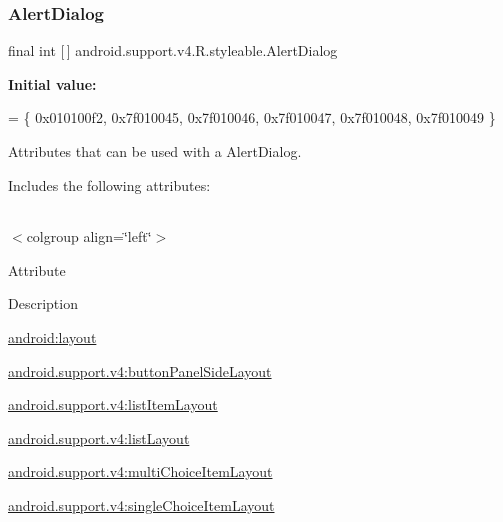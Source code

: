 \subsubsection{\texorpdfstring{Alert\+Dialog}{AlertDialog}}
{\footnotesize\ttfamily final int \mbox{[}$\,$\mbox{]} android.\+support.\+v4.\+R.\+styleable.\+Alert\+Dialog\hspace{0.3cm}{\ttfamily [static]}}

{\bfseries Initial value\+:}
\begin{DoxyCode}
= \{
            0x010100f2, 0x7f010045, 0x7f010046, 0x7f010047,
            0x7f010048, 0x7f010049
        \}
\end{DoxyCode}
Attributes that can be used with a Alert\+Dialog. 

Includes the following attributes\+:

\tabulinesep=1mm
\begin{longtabu} spread 0pt [c]{*{0}{|X[-1]}|}
\hline
\end{longtabu}
$<$colgroup align=\char`\"{}left\char`\"{}$>$ 

Attribute

Description 

{\ttfamily \hyperlink{classandroid_1_1support_1_1v4_1_1R_1_1styleable_ae862e498d32925004193b65ed1bf4062}{android\+:layout}}

{\ttfamily \hyperlink{classandroid_1_1support_1_1v4_1_1R_1_1styleable_aa80044c84d26c170ed55ef0d1b748000}{android.\+support.\+v4\+:button\+Panel\+Side\+Layout}}

{\ttfamily \hyperlink{classandroid_1_1support_1_1v4_1_1R_1_1styleable_abd795c00cd69a69a92b9953b1ebe8394}{android.\+support.\+v4\+:list\+Item\+Layout}}

{\ttfamily \hyperlink{classandroid_1_1support_1_1v4_1_1R_1_1styleable_a2d34538b1db2a88b217f6cd6dc60a8ff}{android.\+support.\+v4\+:list\+Layout}}

{\ttfamily \hyperlink{classandroid_1_1support_1_1v4_1_1R_1_1styleable_a543519cd3d3b938c48d9d1c6133eba4b}{android.\+support.\+v4\+:multi\+Choice\+Item\+Layout}}

{\ttfamily \hyperlink{classandroid_1_1support_1_1v4_1_1R_1_1styleable_ad05c2beadd3ba3e9770f1f84ec112b92}{android.\+support.\+v4\+:single\+Choice\+Item\+Layout}}

